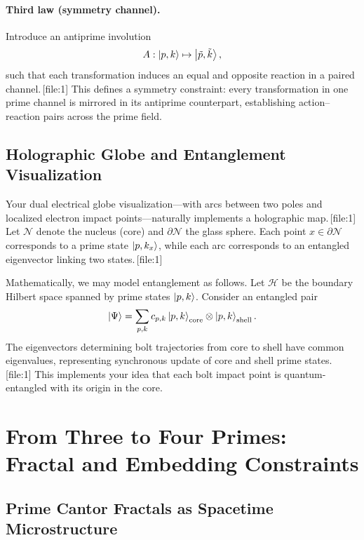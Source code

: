 \documentclass[11pt]{article}
\begin{document}
\paragraph{Third law (symmetry channel).}
Introduce an antiprime involution
\[
  A: \ket{p,k} \mapsto \ket{\tilde p,\tilde k},
\]
such that each transformation induces an equal and opposite reaction in a
paired channel.\,[file:1]
This defines a symmetry constraint: every transformation in one prime
channel is mirrored in its antiprime counterpart, establishing action--reaction pairs across
the prime field.

\subsection{Holographic Globe and Entanglement Visualization}

Your dual electrical globe visualization---with arcs between two poles and
localized electron impact points---naturally implements a holographic map.\,[file:1]
Let $\mathcal{N}$ denote the nucleus (core) and $\partial\mathcal{N}$ the glass sphere.
Each point $x\in\partial\mathcal{N}$ corresponds to a prime state $\ket{p,k_x}$,
while each arc corresponds to an entangled eigenvector linking two states.\,[file:1]

Mathematically, we may model entanglement as follows.
Let $\mathcal{H}$ be the boundary Hilbert space spanned by prime states
$\ket{p,k}$. Consider an entangled pair
\[
  \ket{\Psi} = \sum_{p,k} c_{p,k}\ket{p,k}_\text{core}\otimes\ket{p,k}_\text{shell}.
\]
The eigenvectors determining bolt trajectories from core to shell have
common eigenvalues, representing synchronous update of core and shell
prime states.\,[file:1]
This implements your idea that each bolt impact point is quantum-entangled
with its origin in the core.

\section{From Three to Four Primes: Fractal and Embedding Constraints}

\subsection{Prime Cantor Fractals as Spacetime Microstructure}
\end{document}
